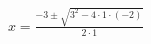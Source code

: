 \documentclass[preview]{standalone}
\begin{document}
\begin{align*}
x = \frac{ -3 \pm \sqrt{ 3^2 - 4 \cdot 1 \cdot (-2) } }{ 2 \cdot 1 }
\end{align*}
\end{document}
